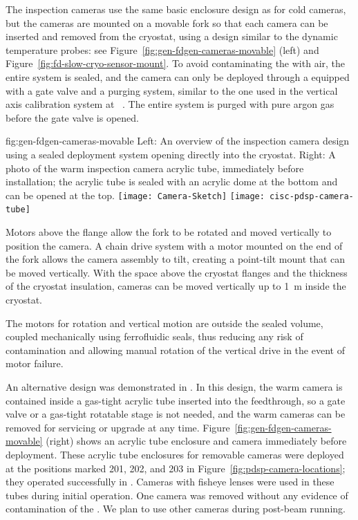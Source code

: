The inspection cameras use the same basic
enclosure design as for cold cameras, but the cameras are mounted on a movable
fork so that each camera can be inserted and removed from the cryostat,
using a design similar to the dynamic temperature probes: see
 Figure~\ref{fig:gen-fdgen-cameras-movable} (left) and
 Figure~\ref{fig:fd-slow-cryo-sensor-mount}.  To avoid contaminating the
 with air, the entire system is sealed, and the
camera can only be deployed through a \fdth equipped with a gate
valve and a purging system, similar to the one used in the vertical axis
calibration system at \kamland~\cite{Banks:2014hra}. The entire system
is  purged with pure argon gas before the gate valve is opened.

\begin{dunefigure}{fig:gen-fdgen-cameras-movable}
  {Left: An overview of the inspection camera design using a sealed deployment system opening directly into the cryostat. Right: A photo of the  warm inspection camera acrylic tube, immediately before installation; the acrylic tube is sealed with an acrylic dome at the bottom and can be opened at the top.}
  \texttt{[image: Camera-Sketch]}%
  \texttt{[image: cisc-pdsp-camera-tube]}%
\end{dunefigure}

Motors above the flange allow the fork to be rotated and moved vertically to position the camera. 
 A chain drive system with a motor
mounted on the end of the fork allows the camera assembly to tilt, 
creating a point-tilt mount that can be moved vertically.
With the space above the cryostat flanges and the
thickness of the cryostat insulation, cameras can be moved vertically up to
\SI{1}{m} inside the cryostat.

The motors for rotation and vertical motion are outside the sealed
volume, coupled mechanically using ferrofluidic seals, thus reducing any risk of
contamination and allowing manual rotation of the vertical
drive in the event of motor failure.  

An alternative design was demonstrated in . In this design, the warm camera is contained inside a gas-tight acrylic tube inserted into the feedthrough, so a gate valve or a gas-tight rotatable stage is not needed, and the warm cameras can be removed for servicing or upgrade at any time. Figure~\ref{fig:gen-fdgen-cameras-movable} (right) shows an acrylic tube enclosure and camera immediately before deployment. These acrylic tube enclosures for removable cameras were deployed at the positions marked 201, 202, and 203 in Figure~\ref{fig:pdsp-camera-locations}; they operated successfully in . Cameras with fisheye lenses were used in these tubes during initial operation.  One camera was removed without any evidence of contamination of the . We plan to use other cameras during post-beam running.

